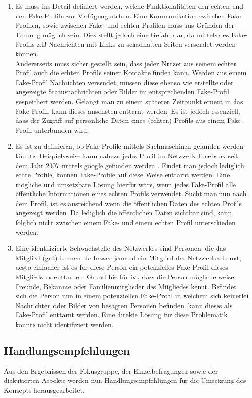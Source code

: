 \documentclass{sigchi}
\begin{document}
\begin{enumerate}
	\item Es muss ins Detail definiert werden, welche Funktionalitäten den echten und den Fake-Profile zur Verfügung stehen. Eine Kommunikation zwischen Fake-Profilen, sowie zwischen Fake- und echten Profilen muss aus Gründen der Tarnung möglich sein. Dies stellt jedoch eine Gefahr dar, da mittels des Fake-Profils z.B Nachrichten mit Links zu schadhaften Seiten versendet werden können.\\ Andererseits muss sicher gestellt sein, dass jeder Nutzer aus seinem echten Profil auch die echten Profile seiner Kontakte finden kann. Werden aus einem Fake-Profil Nachrichten versendet, müssen diese ebenso wie erstellte oder angezeigte Statusnachrichten oder Bilder im entsprechenden Fake-Profil gespeichert werden. Gelangt man zu einem späteren Zeitpunkt erneut in das Fake-Profil, kann dieses ansonsten enttarnt werden. Es ist jedoch essenziell, dass der Zugriff auf persönliche Daten eines (echten) Profils aus einem Fake-Profil unterbunden wird.
	\item Es ist zu definieren, ob Fake-Profile mittels Suchmaschinen gefunden werden könnte. Beispielsweise kann nahezu jedes Profil im Netzwerk Facebook seit dem Jahr 2007 mittels google gefunden werden \cite{FB_Google}. Findet man jedoch lediglich echte Profile, können Fake-Profile auf diese Weise enttarnt werden. Eine mögliche und umsetzbare Lösung hierfür wäre, wenn jedes Fake-Profil alle öffentliche Informationen eines echten Profils verwendet. Sucht man nun nach dem Profil, ist es ausreichend wenn die öffentlichen Daten des echten Profils angezeigt werden. Da lediglich die öffentlichen Daten sichtbar sind, kann folglich nicht zwischen einem Fake- und einem echten Profil unterschieden werden.
	\item Eine identifizierte Schwachstelle des Netzwerkes sind Personen, die das Mitglied (gut) kennen. Je besser jemand ein Mitglied des Netzwerkes kennt, desto einfacher ist es für diese Person ein potenzielles Fake-Profil dieses Mitglieds zu enttarnen. Grund hierfür ist, dass die Person möglicherweise Freunde, Bekannte oder Familienmitglieder des Mitgliedes kennt. Befindet sich die Person nun in einem potenziellen Fake-Profil in welchem sich keinerlei Nachrichten oder Bilder von besagten Personen befinden, kann dieses als Fake-Profil enttarnt werden. Eine direkte Lösung für diese Problematik konnte nicht identifiziert werden. 
\end{enumerate}

\subsection{Handlungsempfehlungen}
\label{Handlungsempfehlung}
Aus den Ergebnissen der Fokusgruppe, der Einzelbefragungen sowie der diskutierten Aspekte werden nun Handlungsempfehlungen für die Umsetzung des Konzepts herausgearbeitet.
\end{document}
